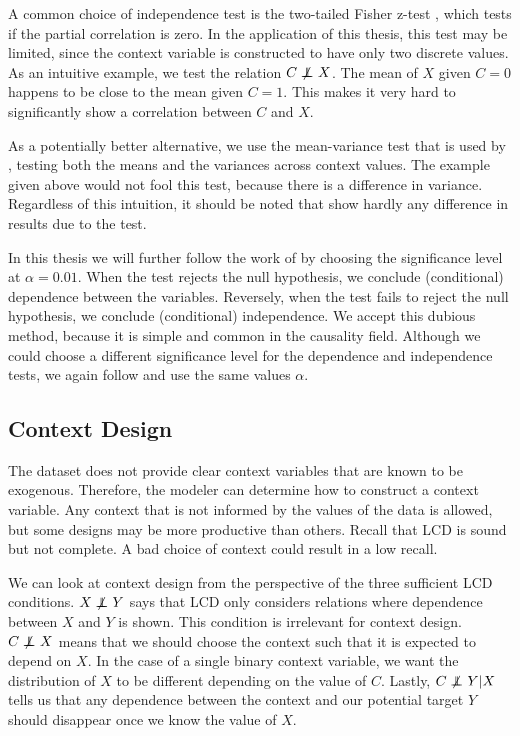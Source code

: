 A common choice of independence test is the two-tailed Fisher z-test \citep{fisher1924distribution}, which tests if the partial correlation is zero. In the application of this thesis, this test may be limited, since the context variable is constructed to have only two discrete values. As an intuitive example, we test the relation $C\operatorname*{{\,\not\mkern-1mu\perp\mkern-12mu\perp\,}} X$. The mean of $X$ given $C=0$ happens to be close to the mean given $C=1$. This makes it very hard to significantly show a correlation between $C$ and $X$. 

As a potentially better alternative, we use the mean-variance test that is used by \citet{versteeg2019boosting}, testing both the means and the variances across context values. The example given above would not fool this test, because there is a difference in variance. Regardless of this intuition, it should be noted that \citet{versteeg2019boosting} show hardly any difference in results due to the test.

In this thesis we will further follow the work of \citet{versteeg2019boosting} by choosing the significance level at $\alpha=0.01$. When the test rejects the null hypothesis, we conclude (conditional) dependence between the variables. Reversely, when the test fails to reject the null hypothesis, we conclude (conditional) independence. We accept this dubious method, because it is simple and common in the causality field. Although we could choose a different significance level for the dependence and independence tests, we again follow \citet{versteeg2019boosting} and use the same values $\alpha$.


\subsection{Context Design}

The \citet{kemmeren2014large} dataset does not provide clear context variables that are known to be exogenous. Therefore, the modeler can determine how to construct a context variable. Any context that is not informed by the values of the data is allowed, but some designs may be more productive than others. Recall that LCD is sound but not complete. A bad choice of context could result in a low recall. 

We can look at context design from the perspective of the three sufficient LCD conditions. $X\operatorname*{{\,\not\mkern-1mu\perp\mkern-12mu\perp\,}} Y$ says that LCD only considers relations where dependence between $X$ and $Y$ is shown. This condition is irrelevant for context design. $C\operatorname*{{\,\not\mkern-1mu\perp\mkern-12mu\perp\,}} X$ means that we should choose the context such that it is expected to depend on $X$. In the case of a single binary context variable, we want the distribution of $X$ to be different depending on the value of $C$. Lastly, $C\operatorname*{{\,\not\mkern-1mu\perp\mkern-12mu\perp\,}} Y|X$ tells us that any dependence between the context and our potential target $Y$ should disappear once we know the value of $X$. 

